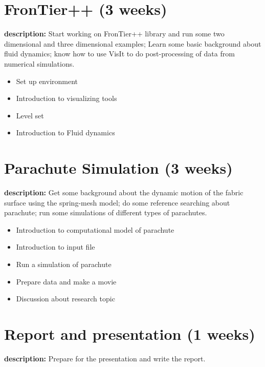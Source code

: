 \documentclass[12pt]{article}
\begin{document}
\section*{FronTier++ (3 weeks)}
\textbf{description:}
Start working on FronTier++ library and run some two dimensional and three
dimensional examples; Learn some basic background about fluid dynamics;
know how to use VisIt to do post-processing of data from numerical simulations.
\begin{itemize}
\item{Set up environment}

\item{Introduction to visualizing tools}
	
\item{Level set}
	
\item{Introduction to Fluid dynamics}

\end{itemize}

\newpage
\section*{Parachute Simulation (3 weeks)}
\textbf{description:}
Get some background about the dynamic motion of the fabric surface using
the spring-mesh model; do some reference searching about parachute; run some
simulations of different types of parachutes.
\begin{itemize}
\item{Introduction to computational model of parachute}
\item{Introduction to input file}
\item{Run a simulation of parachute}
\item{Prepare data and make a movie}
\item{Discussion about research topic}
\end{itemize}

\section*{Report and presentation (1 weeks)}
\textbf{description:}
Prepare for the presentation and write the report.
\end{document}
